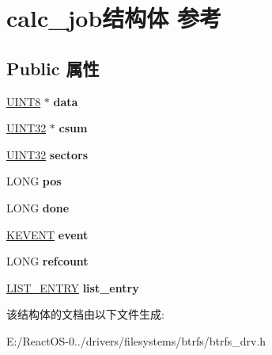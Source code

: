 \hypertarget{structcalc__job}{}\section{calc\+\_\+job结构体 参考}
\label{structcalc__job}
\subsection*{Public 属性}
\begin{DoxyCompactItemize}
\item 
\mbox{\label{structcalc__job_a0b69a9082368fe886f33528f6933755d}} 
\hyperlink{_processor_bind_8h_ab27e9918b538ce9d8ca692479b375b6a}{U\+I\+N\+T8} $\ast$ {\bfseries data}
\item 
\mbox{\label{structcalc__job_a69497a74302af7ce874d801f5b037d34}} 
\hyperlink{_processor_bind_8h_ae1e6edbbc26d6fbc71a90190d0266018}{U\+I\+N\+T32} $\ast$ {\bfseries csum}
\item 
\mbox{\label{structcalc__job_a502e8efa5792fc3ed66f1c509ce64139}} 
\hyperlink{_processor_bind_8h_ae1e6edbbc26d6fbc71a90190d0266018}{U\+I\+N\+T32} {\bfseries sectors}
\item 
\mbox{\label{structcalc__job_aefc9fa628c6c91415e172512fd8a524b}} 
L\+O\+NG {\bfseries pos}
\item 
\mbox{\label{structcalc__job_a0c99bf57fc12d71da050f7939c26fdd9}} 
L\+O\+NG {\bfseries done}
\item 
\mbox{\label{structcalc__job_abff4bd44672a29e82fb16904909b983c}} 
\hyperlink{struct___k_e_v_e_n_t}{K\+E\+V\+E\+NT} {\bfseries event}
\item 
\mbox{\label{structcalc__job_a1376271a7756f8fd5c1177a226bb73d5}} 
L\+O\+NG {\bfseries refcount}
\item 
\mbox{\label{structcalc__job_a8c654590d791d3411b1d8a2cacd4ed66}} 
\hyperlink{struct___l_i_s_t___e_n_t_r_y}{L\+I\+S\+T\+\_\+\+E\+N\+T\+RY} {\bfseries list\+\_\+entry}
\end{DoxyCompactItemize}


该结构体的文档由以下文件生成\+:\begin{DoxyCompactItemize}
\item 
E\+:/\+React\+O\+S-\/0../drivers/filesystems/btrfs/btrfs\+\_\+drv.\+h\end{DoxyCompactItemize}
